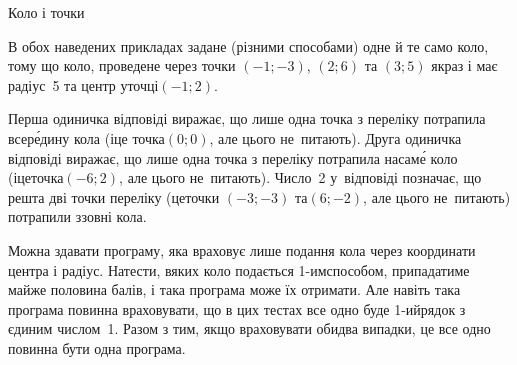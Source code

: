 \begin{problemAllDefault}{Коло і точки}
\ifAfour\else
\vspace{-0.875\baselineskip plus 0.25 ex}
\fi

\Examples\makeTableLongfalse
\hspace{-1em}
\begin{exampleSimple}{5.5em}{3em}%
%
\end{exampleSimple}
\hspace{-1em}
\begin{exampleSimple}{6.5em}{3em}%
%
\end{exampleSimple}

\Notes
В обох наведених прикладах задане (різними способами) одне й те само коло, тому що коло, проведене через точки $(-1; -3)$, $(2; 6)$ та $(3; 5)$ якраз і має радіус~5 та центр у\nolinebreak[3] точці\nolinebreak[3] $(-1; 2)$.

Перша одиничка відповіді виражає, що лише одна точка з переліку потрапила всер\'{е}\-дину кола (і\nolinebreak[3] це точка\nolinebreak[3] $(0; 0)$, але цього не~питають). Друга одиничка відповіді виражає, що лише одна точка з переліку потрапила на\nolinebreak[3] сам\'{е} коло (і\nolinebreak[3] це\nolinebreak[2] точка\nolinebreak[3] $(-6; 2)$, але цього не~питають). Число~2 у~відповіді позначає, що решта дві точки переліку (це\nolinebreak[3] точки $(-3; -3)$ та\nolinebreak[3] $(6; -2)$, але цього не~питають) потрапили ззовні кола.

Можна здавати програму, яка враховує лише подання кола через координати центра і радіус. На\nolinebreak[3] тести, в\nolinebreak[3] яких коло подається \mbox{1-им}\nolinebreak[3] способом, припадатиме майже половина балів, і така програма може їх отримати. Але навіть така програма повинна враховувати, що в цих тестах все одно буде \mbox{1-ий}\nolinebreak[3] рядок з єдиним числом~1.
% 
Разом з тим, якщо враховувати обидва випадки, це все одно повинна бути одна програма.

\end{problemAllDefault}
